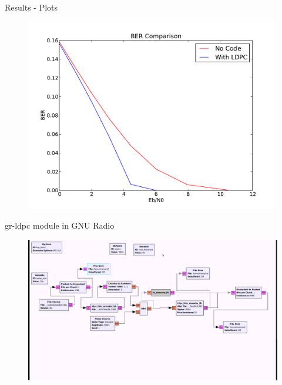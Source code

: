 \documentclass{beamer}
\begin{document}
\begin{frame}{Results - Plots}
 \begin{figure}
  \centering
  \includegraphics[scale=0.5]{ber_plot}
\end{figure}
\end{frame}

\begin{frame}{gr-ldpc module in GNU Radio}
  \begin{figure}
  \centering
  \includegraphics[scale=0.17]{ldpc}
\end{figure}
\end{frame}
\end{document}

